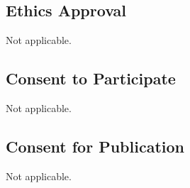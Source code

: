 	
\subsection*{Ethics Approval}
	
Not applicable.
	
\subsection*{Consent to Participate}
	
Not applicable.
	
\subsection*{Consent for Publication}
	
Not applicable.
	
	
	
	
	
	
	
	

